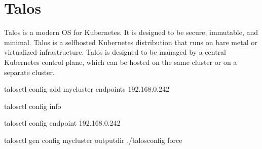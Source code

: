 \documentclass[letterpaper,10pt,english]{sphinxmanual}
\begin{document}
\sphinxstepscope


\chapter{Talos}
\label{\detokenize{talos:talos}}\label{\detokenize{talos::doc}}

\sphinxAtStartPar
Talos is a modern OS for Kubernetes. It is designed to be secure, immutable, and minimal. Talos is a self\sphinxhyphen{}hosted Kubernetes distribution that runs on bare metal or virtualized infrastructure. Talos is designed to be managed by a central Kubernetes control plane, which can be hosted on the same cluster or on a separate cluster.

\sphinxAtStartPar
talosctl config add my\sphinxhyphen{}cluster \textendash{}endpoints 192.168.0.242

\sphinxAtStartPar
talosctl config info

\sphinxAtStartPar
talosctl config endpoint 192.168.0.242

\sphinxAtStartPar
talosctl gen config my\sphinxhyphen{}cluster  \textendash{}output\sphinxhyphen{}dir ./talos\sphinxhyphen{}config \textendash{}force
\end{document}

